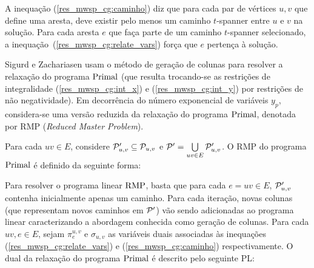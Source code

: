 A inequação (\ref{res_mwsp_cg:caminho}) diz que para cada par de
vértices $u,v$ que define uma aresta, deve existir pelo menos um
caminho $t$-spanner entre $u$ e $v$ na solução.  Para cada aresta $e$
que faça parte de um caminho $t$-spanner selecionado, a
inequação~(\ref{res_mwsp_cg:relate_vars}) força que $e$ pertença à
solução.

Sigurd e Zachariasen usam o método de geração de colunas para resolver
a relaxação do programa $\rm{Primal}$ (que resulta trocando-se as
restrições de integralidade (\ref{res_mwsp_cg:int_x}) e
(\ref{res_mwsp_cg:int_y}) por restrições de não negatividade).  Em
decorrência do número exponencial de variáveis $y_p$, considera-se uma
versão reduzida da relaxação do programa $\rm{Primal}$, denotada por RMP
(\emph{Reduced Master Problem}).

Para cada $uv \in E$, considere $\mathcal{P}_{u,v}' \subseteq \mathcal{P}_{u,v}$ e
$\mathcal{P}' = \bigcup\limits_{uv \in E} \mathcal{P}_{u,v}'$. O RMP do programa $\rm{Primal}$ é definido da seguinte forma:
%
\begin{lpformulation}[\RMP]
\end{lpformulation}

Para resolver o programa linear $\rm{RMP}$, basta que para cada $e=uv \in E$,
$\mathcal{P}_{u,v}'$ contenha inicialmente apenas um caminho. Para cada
iteração, novas colunas (que representam novos caminhos em
$\mathcal{P}'$) vão sendo adicionadas ao programa linear caracterizando a
abordagem conhecida como geração de colunas. Para cada $uv, e \in E$,
sejam $\pi^{u,v}_{e}$ e $\sigma_{u,v}$ as variáveis duais associadas
às inequações (\ref{res_mwsp_cg:relate_vars}) e
(\ref{res_mwsp_cg:caminho}) respectivamente. O dual da relaxação do
programa $\rm{Primal}$ é descrito pelo seguinte PL:
%
\begin{lpformulation}[\FullDualPL]
\end{lpformulation}

